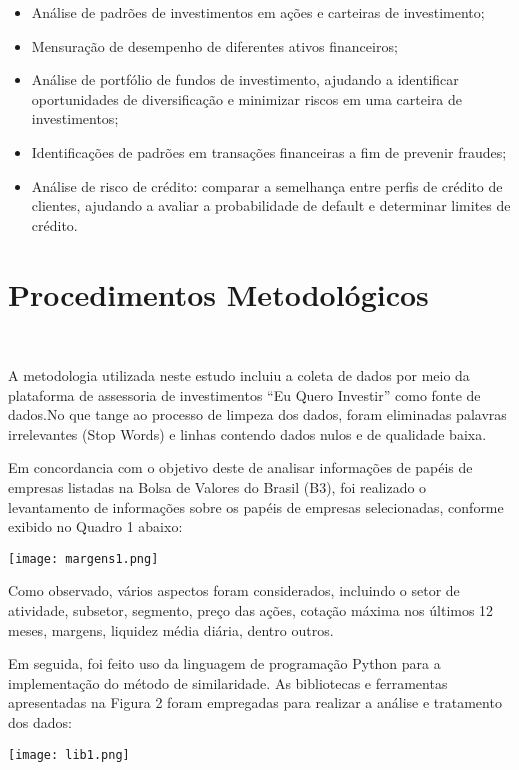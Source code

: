 \documentclass[12pt, a4paper]{article}
\begin{document}
\begin{itemize}
    \item Análise de padrões de investimentos em ações e carteiras de investimento;
    \item Mensuração de desempenho de diferentes ativos financeiros;
    \item Análise de portfólio de fundos de investimento, ajudando a identificar oportunidades de diversificação e minimizar riscos em uma carteira de investimentos;
    \item Identificações de padrões em transações financeiras a fim de prevenir fraudes;
    \item Análise de risco de crédito: comparar a semelhança entre perfis de crédito de clientes, ajudando a avaliar a probabilidade de default e determinar limites de crédito.\\
\end{itemize}

\section{Procedimentos Metodológicos}\

A metodologia utilizada neste estudo incluiu a coleta de dados por meio da plataforma de assessoria de investimentos “Eu Quero Investir” como fonte de dados.No que tange ao processo de limpeza dos dados, foram eliminadas palavras irrelevantes (Stop Words) e linhas contendo dados nulos e de qualidade baixa.

Em concordancia com o objetivo deste de analisar informações de papéis de empresas listadas na Bolsa de Valores do Brasil (B3), foi realizado o levantamento de informações sobre os papéis de empresas selecionadas, conforme exibido no Quadro 1 abaixo: \\

\begin{center}
     \texttt{[image: margens1.png]}
\end{center}

Como observado, vários aspectos foram considerados, incluindo o setor de atividade, subsetor, segmento, preço das ações, cotação máxima nos últimos 12 meses, margens, liquidez média diária, dentro outros.

Em seguida, foi feito uso da linguagem de programação Python para a implementação do método de similaridade. As bibliotecas e ferramentas apresentadas na Figura 2 foram empregadas para realizar a análise e tratamento dos dados:\\
\begin{center}
    \texttt{[image: lib1.png]}
\end{center}
\end{document}
